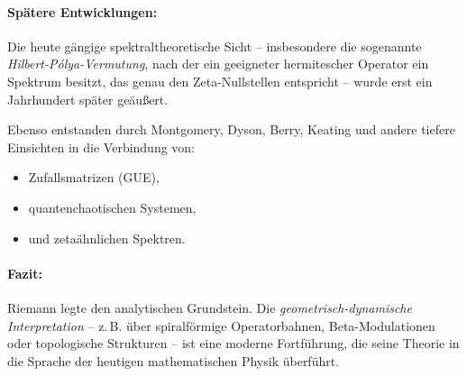 \paragraph{Spätere Entwicklungen:}
Die heute gängige spektraltheoretische Sicht – insbesondere die sogenannte \emph{Hilbert-Pólya-Vermutung},  
nach der ein geeigneter hermitescher Operator ein Spektrum besitzt, das genau den Zeta-Nullstellen entspricht – wurde erst ein Jahrhundert später geäußert.

Ebenso entstanden durch Montgomery, Dyson, Berry, Keating und andere tiefere Einsichten in die Verbindung von:
\begin{itemize}
    \item Zufallsmatrizen (GUE),
    \item quantenchaotischen Systemen,
    \item und zetaähnlichen Spektren.
\end{itemize}

\paragraph{Fazit:} Riemann legte den analytischen Grundstein.  
Die \emph{geometrisch-dynamische Interpretation} – z.\,B. über spiralförmige Operatorbahnen, Beta-Modulationen oder topologische Strukturen – ist eine moderne Fortführung,  
die seine Theorie in die Sprache der heutigen mathematischen Physik überführt.
